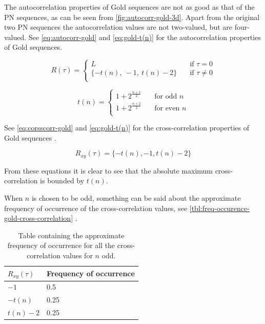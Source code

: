The autocorrelation properties of Gold sequences are not as good as that of the PN sequences, as can be seen from \autoref{fig:autocorr-gold-3d}.
Apart from the original two PN sequences the autocorrelation values are not two-valued, but are four-valued.
See \autoref{eq:autocorr-gold} and \autoref{eq:gold-t(n)} for the autocorrelation properties of Gold sequences.

\begin{equation}
	\label{eq:autocorr-gold}
	R(\tau) = 
		\begin{cases}
			L    							& \quad \text{if } \tau = 0 \\
			\{ -t(n), \ -1, \ t(n) - 2  \} 	& \quad \text{if } \tau \neq 0 \\
		\end{cases}
\end{equation}

\begin{equation}
	\label{eq:gold-t(n)}
	t(n) = 
		\begin{cases}
			1 + 2^{\frac{n+1}{2}} & \quad \text{for odd } n \\
			1 + 2^{\frac{n+2}{2}} & \quad \text{for even } n \\
		\end{cases}
\end{equation}

See \autoref{eq:corsscorr-gold} and \autoref{eq:gold-t(n)} for the cross-correlation properties of Gold sequences \cite{mitra2008pseudo}.

\begin{equation}
	\label{eq:corsscorr-gold}
	R_{xy}(\tau) = 	\{ -t(n), -1, t(n) - 2  \} 
\end{equation}


From these equations it is clear to see that the absolute maximum cross-correlation is bounded by $t(n)$.

When $n$ is chosen to be odd, something can be said about the approximate frequency of occurrence of the cross-correlation values, see \autoref{tbl:freq-occurence-gold-cross-correlation} \cite{holmes2007spread}.

\begin{table}[h]
	\centering
	\begin{tabular}{ | l | l | }

		\hline
		$R_{xy}(\tau)$ 	& Frequency of occurrence	\\ \hline

		$-1$			& 0.5					 	\\ \hline
		$-t(n)$			& 0.25						\\ \hline
		$t(n) - 2$		& 0.25						\\ \hline

		

	\end{tabular}
	\caption{Table containing the approximate frequency of occurrence for all the cross-correlation values for $n$ odd.}
	\label{tbl:freq-occurence-gold-cross-correlation}
\end{table}

